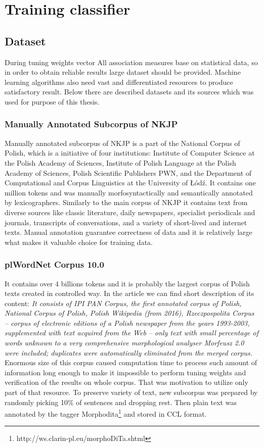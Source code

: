 \chapter{Training classifier}

\section{Dataset}\label{dataset}
During tuning weights vector 
All association measures base on statistical data, so in order to obtain reliable results large dataset should be provided.
Machine learning algorithms also need vast and differentiated resources to produce satisfactory result.
Below there are described datasets and its sources which was used for purpose of this thesis.

\subsection{Manually Annotated Subcorpus of NKJP}
Manually annotated subcorpus of NKJP is a part of the National Corpus of Polish, which is a initiative of four institutions: 
Institute of Computer Science at the Polish Academy of Sciences, Institute of Polish Language at the Polish Academy of Sciences, 
Polish Scientific Publishers PWN, and the Department of Computational and Corpus Linguistics at the University of Łódź.
It contains one million tokens and was manually morfosyntactically and semantically annotated by lexicographers. 
Similarly to the main corpus of NKJP it contains text from diverse sources like classic literature, daily newspapers, 
specialist periodicals and journals, transcripts of conversations, and a variety of short-lived and internet texts. 
Manual annotation guarantee correctness of data and it is relatively large what makes it valuable choice for training data.

\subsection{plWordNet Corpus 10.0}

It contains over 4 billions tokens and it is probably the largest corpus of Polish texts created in controlled way. 
In the article \cite{kgr10} we can find short description of its content: \emph{It consists of IPI PAN Corpus, 
the first annotated corpus of Polish,  National Corpus of Polish, Polish Wikipedia (from 2016), Rzeczpospolita Corpus 
-- corpus of electronic editions of a Polish newspaper from the years 1993-2003, supplemented with text acquired from the Web 
-- only text with small percentage of words unknown to a very comprehensive morphological analyser Morfeusz 2.0 
were included; duplicates were automatically eliminated from the merged corpus.}
Enormous size of this corpus caused computation time to process such amount of information 
long enough to make it impossible to perform tuning weights and verification of the results on whole corpus. 
That was motivation to utilize only part of that resource. To preserve variety of text, new subcorpus was prepared by randomly picking 
10\% of sentences and dropping rest. Then plain text was annotated by the tagger Morphodita\footnote{http://ws.clarin-pl.eu/morphoDiTa.shtml} and stored in CCL format.

